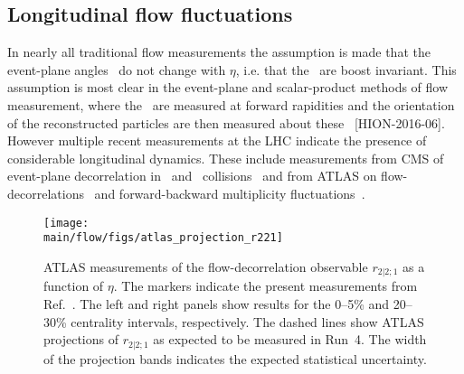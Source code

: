 \subsection{Longitudinal flow fluctuations}

In nearly all traditional flow measurements the assumption is made that the 
  event-plane angles \psin\ do not change with $\eta$, i.e. that the \psin\
  are boost invariant.
This assumption is most clear in the event-plane and scalar-product methods
  of flow measurement,  where the \psin\ are measured at forward rapidities
  and the orientation of the reconstructed particles are then measured about
  these \psin~[HION-2016-06].
However multiple recent measurements at the LHC indicate the presence of 
  considerable longitudinal dynamics.
These include measurements from CMS of event-plane decorrelation in \ppb\ and \pbpb\ 
  collisions~\cite{CMS-HIN-14-012,CMS-HIN-15-008} and from ATLAS on flow-decorrelations~\cite{HION-2016-04}
  and forward-backward multiplicity fluctuations~\cite{HION-2015-13}.




\begin{figure*}[!htb]
\begin{center}
\texttt{[image: \\main/flow/figs/atlas\_projection\_r221]}
\caption{
ATLAS measurements of the flow-decorrelation observable $r_{2|2;1}$ 
  as a function of $\eta$.
The markers indicate the present measurements from Ref.~\cite{HION-2016-04}.
The left and right panels show results for the 0--5\% and 20--30\%
  centrality intervals,  respectively.
The dashed lines show ATLAS projections of $r_{2|2;1}$ as expected to 
  be measured in Run~4.  
The width of the projection bands indicates the expected statistical uncertainty.
}
\label{fig:atlas_r221}
\end{center}
\end{figure*}


